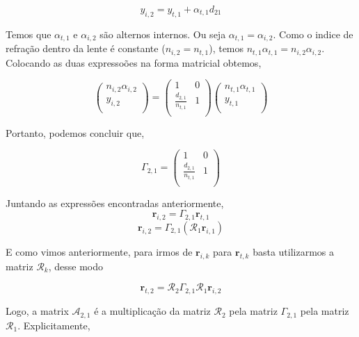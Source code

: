 \documentclass[11pt]{article}
\begin{document}
\begin{pproblem}
\begin{pssolution*}{}{}
\begin{alternativas}
        \[y_{i,2} = y_{t,1} + \alpha_{t,1}d_{21}\]

        Temos que \(\alpha_{t,1}\) e \(\alpha_{i,2}\) são alternos internos. Ou seja \(\alpha_{t,1}=\alpha_{i,2}\). Como o indice de refração dentro da lente é constante (\(n_{i,2} = n_{t,1}\)), temos \(n_{t,1}\alpha_{t,1} = n_{i,2}\alpha_{i,2}\). Colocando as duas expressoões na forma matricial obtemos, 

        \[\begin{pmatrix}
            n_{i,2}\alpha_{i,2}\\
            y_{i,2}\\
        \end{pmatrix}
        =
        \begin{pmatrix}
            1 & 0 \\
            \frac{d_{2,1}}{n_{t,1}} & 1 \\
        \end{pmatrix}
        \begin{pmatrix}
            n_{t,1}\alpha_{t,1} \\
            y_{t,1}\\
        \end{pmatrix}
        \]

        Portanto, podemos concluir que, 

        \[\boxed{\Gamma_{2,1} = \begin{pmatrix}
        1 & 0 \\
        \frac{d_{2,1}}{n_{t,1}} & 1 \\
        \end{pmatrix}}\]

        \item Juntando as expressões encontradas anteriormente, 
        \[\mathbf{r}_{i,2} = \Gamma_{2,1} \mathbf{r}_{t,1}\]
        \[\mathbf{r}_{i,2} = \Gamma_{2,1} (\mathcal{R}_1\mathbf{r}_{i,1})\]

        E como vimos anteriormente, para irmos de \(\mathbf{r}_{i,k}\) para \(\mathbf{r}_{t,k}\) basta utilizarmos a matriz \(\mathcal{R}_k\), desse modo

        \[\mathbf{r}_{t,2} = \mathcal{R}_2\Gamma_{2,1}\mathcal{R}_1\mathbf{r}_{i,2}\]

        Logo, a matrix \(\mathcal{A}_{2,1}\) é a multiplicação da matriz \(\mathcal{R}_2\) pela matriz \(\Gamma_{2,1}\) pela matriz \(\mathcal{R}_1\). Explicitamente, 


\end{alternativas}
\end{pssolution*}
\end{pproblem}
\end{document}
